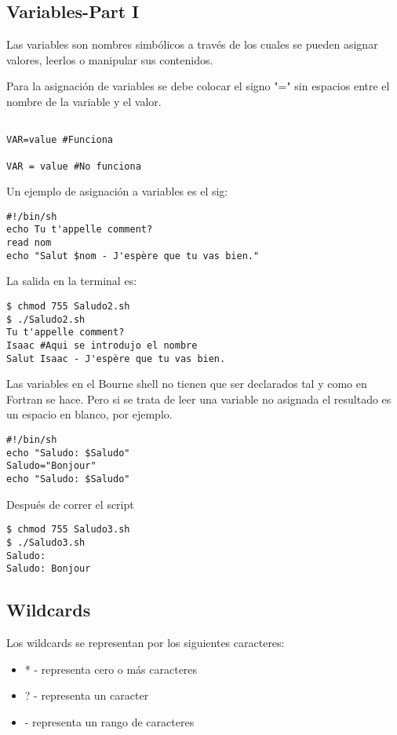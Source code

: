 \documentclass[a4paper]{article}
\begin{document}
\subsection{Variables-Part I}

Las variables son nombres simbólicos a través de los cuales se pueden asignar valores, leerlos o manipular sus contenidos. 

Para la asignación de variables se debe colocar el signo "=" sin espacios entre el nombre de la variable y el valor. 



\begin{verbatim}

VAR=value #Funciona

VAR = value #No funciona
\end{verbatim}

Un ejemplo de asignación a variables es el sig:

\begin{verbatim}
#!/bin/sh
echo Tu t'appelle comment?
read nom
echo "Salut $nom - J'espère que tu vas bien."
\end{verbatim}

La salida en la terminal es:

\begin{verbatim}
$ chmod 755 Saludo2.sh
$ ./Saludo2.sh
Tu t'appelle comment?
Isaac #Aqui se introdujo el nombre
Salut Isaac - J'espère que tu vas bien.
\end{verbatim}

Las variables en el Bourne shell no tienen que ser declarados tal y como en Fortran se hace. Pero si se trata de leer una variable no asignada el resultado es un espacio en blanco, por ejemplo.

\begin{verbatim}
#!/bin/sh
echo "Saludo: $Saludo"
Saludo="Bonjour"
echo "Saludo: $Saludo"
\end{verbatim}

Después de correr el script
\begin{verbatim}
$ chmod 755 Saludo3.sh
$ ./Saludo3.sh
Saludo:
Saludo: Bonjour
\end{verbatim}


\subsection{Wildcards}
Los wildcards se representan por los siguientes caracteres:

\begin{itemize}
\item * - representa cero o más caracteres
\item ? - representa un caracter
\item \*[ ] - representa un rango de caracteres
\end{itemize}
\end{document}
